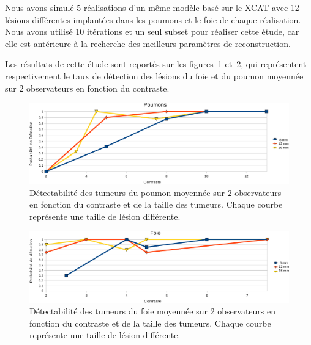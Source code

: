 Nous avons simulé 5 réalisations d'un même modèle basé sur le XCAT avec 12 lésions différentes implantées dans les poumons et le foie de chaque réalisation. Nous avons utilisé 10 itérations et un seul subset pour réaliser cette étude, car elle est antérieure à la recherche des meilleurs paramètres de reconstruction.

Les résultats de cette étude sont reportés sur les figures~\ref{fig:calibration} et~\ref{fig:calibrationFoie}, qui représentent respectivement le taux de détection des lésions du foie et du poumon moyennée sur 2 observateurs en fonction du contraste.




\begin{figure}[h!]
\centering
\includegraphics[width=16cm]{images/calibration_crop}
\caption[Détectabilité des tumeurs du poumon en fonction du contraste et de la taille des tumeurs]{Détectabilité des tumeurs du poumon moyennée sur 2 observateurs en fonction du contraste et de la taille des tumeurs. Chaque courbe représente une taille de lésion différente.} 
\label{fig:calibration}
\end{figure}

\begin{figure}[h!]
\centering
\includegraphics[width=16cm]{images/calibrationFoie_crop}
\caption[Détectabilité des tumeurs du foie en fonction du contraste et de la taille des tumeurs]{Détectabilité des tumeurs du foie moyennée sur 2 observateurs en fonction du contraste et de la taille des tumeurs. Chaque courbe représente une taille de lésion différente.} 
\label{fig:calibrationFoie}
\end{figure}


